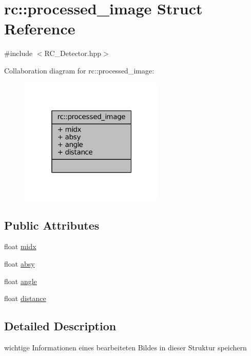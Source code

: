 \hypertarget{structrc_1_1processed__image}{\section{rc\+:\+:processed\+\_\+image Struct Reference}
\label{structrc_1_1processed__image}
}


{\ttfamily \#include $<$R\+C\+\_\+\+Detector.\+hpp$>$}



Collaboration diagram for rc\+:\+:processed\+\_\+image\+:\nopagebreak
\begin{figure}[H]
\begin{center}
\leavevmode
\includegraphics[width=196pt]{structrc_1_1processed__image__coll__graph}
\end{center}
\end{figure}
\subsection*{Public Attributes}
\begin{DoxyCompactItemize}
\item 
float \hyperlink{structrc_1_1processed__image_a0213f6e61795e2dbcaa500885554dbde}{midx}
\item 
float \hyperlink{structrc_1_1processed__image_a3885be6e15744069afb4b429777497fa}{absy}
\item 
float \hyperlink{structrc_1_1processed__image_ac17fea85630583e2cf1de55b89334e4f}{angle}
\item 
float \hyperlink{structrc_1_1processed__image_a6f90b2318450001568fcc112e294f8df}{distance}
\end{DoxyCompactItemize}


\subsection{Detailed Description}
wichtige Informationen eines bearbeiteten Bildes in dieser Struktur speichern 

